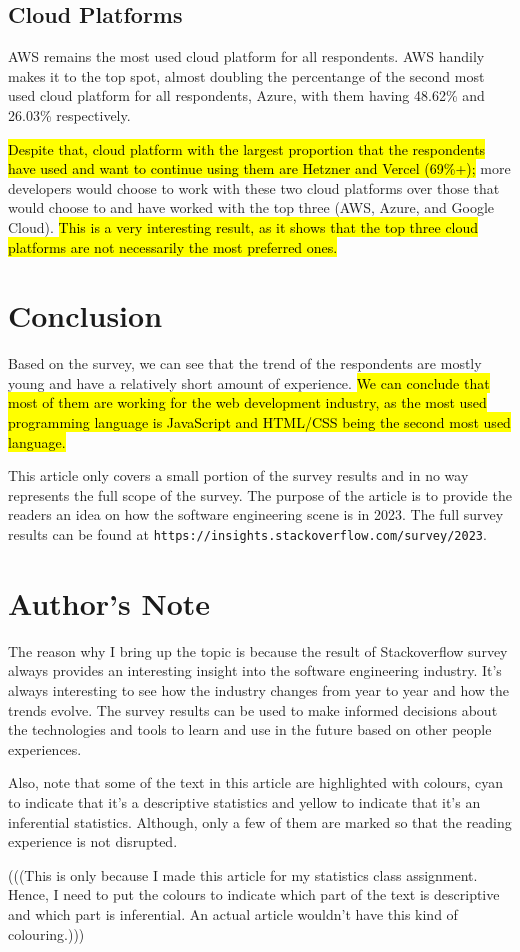 \documentclass[12pt,titlepage]{article}
\begin{document}
\subsection{Cloud Platforms}
AWS remains the most used cloud platform for all respondents. AWS handily makes it to the 
top spot, almost doubling the percentange of the second most used cloud platform for all
respondents, Azure, with them having 48.62\% and 26.03\% respectively.

\hl{Despite that, cloud platform with the largest proportion that the respondents have used and want
to continue using them are Hetzner and Vercel (69\%+);} more developers would choose to work with
these two cloud platforms over those that would choose to and have worked with the top three
(AWS, Azure, and Google Cloud).  \hl{This is a very interesting result, as it shows that the top
three cloud platforms are not necessarily the most preferred ones.}

\section{Conclusion}
Based on the survey, we can see that the trend of the respondents are mostly young and have
a relatively short amount of experience. \hl{We can conclude that most of them are working
for the web development industry, as the most used programming language is JavaScript and
HTML/CSS being the second most used language.}

This article only covers a small portion of the survey results and in no way represents the
full scope of the survey. The purpose of the article is to provide the readers an idea
on how the software engineering scene is in 2023. The full survey results can be
found at \texttt{https://insights.stackoverflow.com/survey/2023}.

\section{Author's Note}

The reason why I bring up the topic is because the result of Stackoverflow survey always
provides an interesting insight into the software engineering industry. It's always interesting
to see how the industry changes from year to year and how the trends evolve. The survey
results can be used to make informed decisions about the technologies and tools to learn
and use in the future based on other people experiences.

Also, note that some of the text in this article are highlighted with colours, cyan to indicate that
it's a descriptive statistics and yellow to indicate that it's an inferential statistics. Although,
only a few of them are marked so that the reading experience is not disrupted.

(((This is only because I made this article for my statistics class assignment. Hence, I need to put
the colours to indicate which part of the text is descriptive and which part is inferential.
An actual article wouldn't have this kind of colouring.)))
\end{document}
